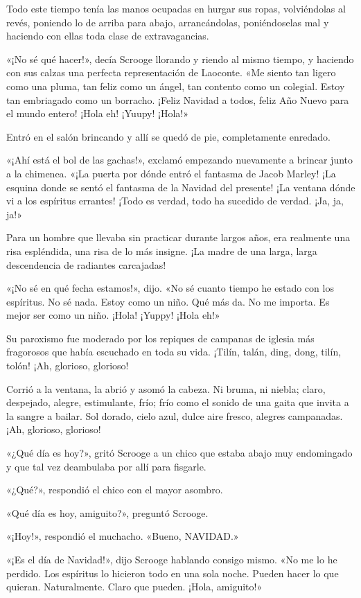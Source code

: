 \documentclass{novela}
\begin{document}
 Todo este tiempo tenía las manos ocupadas en hurgar sus ropas, volviéndolas al revés, poniendo lo de arriba para abajo, arrancándolas, poniéndoselas mal y haciendo con ellas toda clase de extravagancias.

 «¡No sé qué hacer!», decía Scrooge llorando y riendo al mismo tiempo, y haciendo con sus calzas una perfecta representación de Laoconte. «Me siento tan ligero como una pluma, tan feliz como un ángel, tan contento como un colegial. Estoy tan embriagado como un borracho. ¡Feliz Navidad a todos, feliz Año Nuevo para el mundo entero! ¡Hola eh! ¡Yuupy! ¡Hola!»

 Entró en el salón brincando y allí se quedó de pie, completamente enredado.

 «¡Ahí está el bol de las gachas!», exclamó empezando nuevamente a brincar junto a la chimenea. «¡La puerta por dónde entró el fantasma de Jacob Marley! ¡La esquina donde se sentó el fantasma de la Navidad del presente! ¡La ventana dónde vi a los espíritus errantes! ¡Todo es verdad, todo ha sucedido de verdad. ¡Ja, ja, ja!»

 Para un hombre que llevaba sin practicar durante largos años, era realmente una risa espléndida, una risa de lo más insigne. ¡La madre de una larga, larga descendencia de radiantes carcajadas!

 «¡No sé en qué fecha estamos!», dijo. «No sé cuanto tiempo he estado con los espíritus. No sé nada. Estoy como un niño. Qué más da. No me importa. Es mejor ser como un niño. ¡Hola! ¡Yuppy! ¡Hola eh!»

 Su paroxismo fue moderado por los repiques de campanas de iglesia más fragorosos que había escuchado en toda su vida. ¡Tilín, talán, ding, dong, tilín, tolón! ¡Ah, glorioso, glorioso!

 Corrió a la ventana, la abrió y asomó la cabeza. Ni bruma, ni niebla; claro, despejado, alegre, estimulante, frío; frío como el sonido de una gaita que invita a la sangre a bailar. Sol dorado, cielo azul, dulce aire fresco, alegres campanadas. ¡Ah, glorioso, glorioso!

 «¿Qué día es hoy?», gritó Scrooge a un chico que estaba abajo muy endomingado y que tal vez deambulaba por allí para fisgarle.

 «¿Qué?», respondió el chico con el mayor asombro.

 «Qué día es hoy, amiguito?», preguntó Scrooge.

 «¡Hoy!», respondió el muchacho. «Bueno, NAVIDAD.»

 «¡Es el día de Navidad!», dijo Scrooge hablando consigo mismo. «No me lo he perdido. Los espíritus lo hicieron todo en una sola noche. Pueden hacer lo que quieran. Naturalmente. Claro que pueden. ¡Hola, amiguito!»
\end{document}

